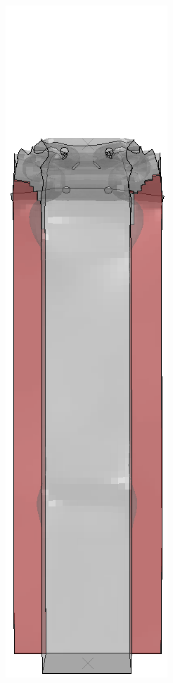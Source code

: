 \documentclass[
documentsize = a4, %
font = cmr, %
typesize = 11, %
printmode = true,
onehalfspacing = true,
language = en, %
titlepage = udciccp, %
degree = pt, %
dedication = true,
acknowledgements = true,
abstract-en = true,
abstract-es = false,
abstract-ga = false,
epigraphs = true,
toc = true,
lof = true,
lot = true,
frontmatterintoc = false,
notation = false,
minimal = false,
]{UDCthesis}
\begin{document}
\begin{figure}
\begin{minipage}[b]{.06\linewidth}
	\end{minipage}
	\quad
	\begin{minipage}[b]{.06\linewidth}
		\centering
		\includegraphics[width=\linewidth]{IMG_CUTRES/a4}

\end{minipage}
\end{figure}
\end{document}

